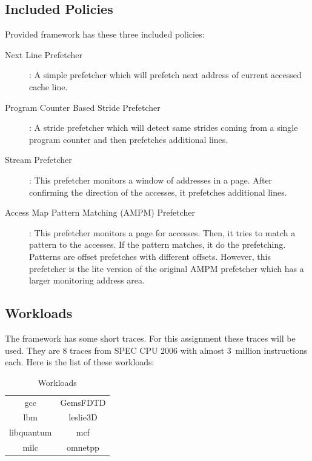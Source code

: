 \documentclass{article}
\begin{document}
\subsection{Included Policies}
Provided framework has these three included policies:
\begin{description}
 \item [Next Line Prefetcher]: A simple prefetcher which will prefetch next address of current accessed cache line.
 \item [Program Counter Based Stride Prefetcher]: A stride prefetcher which will detect same strides coming from a single program counter and then prefetches additional lines.
 \item [Stream Prefetcher]: This prefetcher monitors a window of addresses in a page. After confirming the direction of the accesses, it prefetches additional lines.
 \item [Access Map Pattern Matching (AMPM) Prefetcher]: This prefetcher monitors a page for accesses. Then, it tries to match a pattern to the accesses. If the pattern matches, it do the prefetching. Patterns are offset prefetches with different offsets. However, this prefetcher is the lite version of the original AMPM prefetcher which has a larger monitoring address area. 
\end{description}

\subsection{Workloads}
The framework has some short traces. For this assignment these traces will be used. They are 8 traces from SPEC CPU 2006 with almost 3~million instructions each. Here is the list of these workloads:
\begin{table}[!h]
\centering
\begin{tabular}{|| c | c ||}
\hline \hline 
gcc & GemsFDTD \\
lbm & leslie3D \\
libquantum & mcf \\
milc & omnetpp \\
\hline \hline
\end{tabular}
\caption{Workloads}
\label{table_bench}
\end{table}
\end{document}

